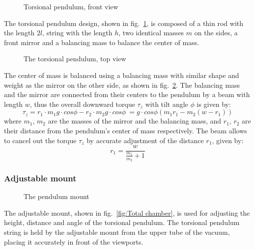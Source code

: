 \documentclass[\main/master.tex]{subfiles}
\begin{document}
\begin{figure}[htbp]
	\centering
	\caption[Torsional pendulum, front view]{Torsional pendulum, front view}
	\label{fig:pendulum front}
\end{figure}
\FloatBarrier
\par\noindent
The torsional pendulum design, shown in fig.~\ref{fig:pendulum front}, is composed of a thin rod with the length $2l$, string with the length $h$, two identical masses $m$ on the sides, a front mirror and a balancing mass to balance the center of mass. 
\begin{figure}[htbp]
	\centering
	\caption[The torsional pendulum, top view]{The torsional pendulum, top view}
	\label{fig:pendulum top}
\end{figure}
\FloatBarrier 
\par\noindent
The center of mass is balanced using a balancing mass with similar shape and weight as the mirror on the other side, as shown in fig.~\ref{fig:pendulum top}. The balancing mass and the mirror are connected from their centers to the pendulum by a beam with length $w$, thus the overall downward torque $\tau_z$ with tilt angle $\phi$ is given by:
\begin{equation}
\tau_z = r_1\cdot m_1 g \cdot cos\phi - r_2\cdot m_2 g \cdot cos \phi\ = g\cdot cos\phi( m_1 r_1  - m_2 (w-r_1) )    \label{eqn:downward torque}
\end{equation}
where $m_1$, $m_2$ are the masses of the mirror and the balancing mass, and $r_1$, $r_2$ are their distance from the pendulum's center of mass respectively. The beam allows to cancel out the torque $\tau_z$ by accurate adjustment of the distance $r_1$, given by: 
\begin{equation}
 r_1 = \frac{w}{\frac{m_1}{m_2}+1}  \label{eqn:downward torque cancelled}
\end{equation}
\subsubsection{Adjustable mount}
\begin{figure}[htbp]
	\centering
	\caption[The pendulum mount]{The pendulum mount}
	\label{fig:mount}
\end{figure}
\par\noindent
The adjustable mount, shown in fig.~\ref{fig:Total chamber}, is used for adjusting the height, distance and angle of the torsional pendulum. The torsional pendulum string is held by the adjustable mount from the upper tube of the vacuum, placing it accurately in front of the viewports. 
\end{document}
